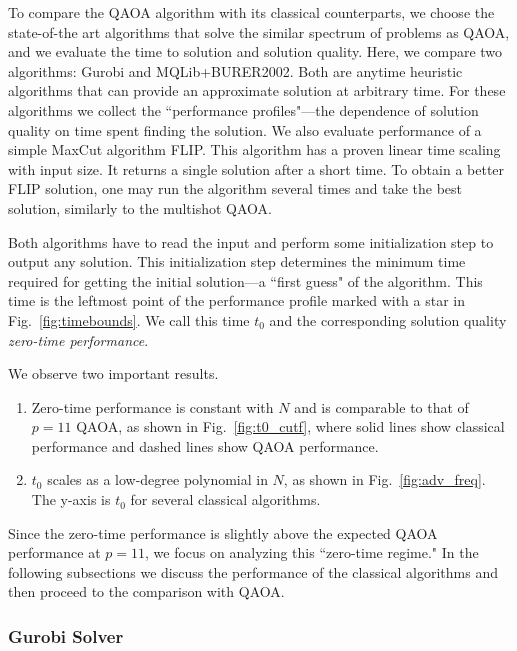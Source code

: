 \documentclass[prb,reprint,nofootinbib,longbibliography,superscriptaddress]{revtex4-1}
\begin{document}
To compare the QAOA algorithm with its classical counterparts, we choose the state-of-the art algorithms that solve the similar spectrum of problems as QAOA, and we  evaluate the time to solution and solution quality. Here, we compare  two algorithms: Gurobi and MQLib+BURER2002. 
Both are anytime heuristic algorithms that can provide an approximate solution at arbitrary time. For these algorithms we 
collect the ``performance profiles"---the dependence of solution quality on time spent  finding the solution.
We also evaluate performance of a simple MaxCut algorithm FLIP. This algorithm has a proven linear time scaling with input size. It returns a single solution after a short time. To obtain a better FLIP solution, one may run the algorithm several times and take the best solution, similarly to the multishot QAOA.

Both algorithms have to read the input and perform some initialization step to output any solution. This initialization step determines the minimum time required for getting the initial 
solution---a ``first guess" of the algorithm. This time is the leftmost point of the performance profile marked with a star in Fig.~\ref{fig:timebounds}. 
We call this time $t_0$ and the corresponding solution quality \emph{zero-time performance}.

We observe two important results.
\begin{enumerate}
    \item Zero-time performance is constant with $N$ and is comparable to that of $p=11$ QAOA,
    as shown in Fig.~\ref{fig:t0_cutf}, where solid lines show classical performance and dashed lines show QAOA performance.
    \item $t_0$ scales as a low-degree polynomial in $N$, as shown in Fig.~\ref{fig:adv_freq}. The y-axis is $t_0$ for several classical algorithms.
\end{enumerate}

Since the zero-time performance is slightly above the expected QAOA performance at $p=11$, we focus on analyzing this ``zero-time regime."
In the following subsections we discuss the performance of the classical algorithms and then proceed to the comparison with QAOA.

\subsubsection{Gurobi Solver}
\end{document}
